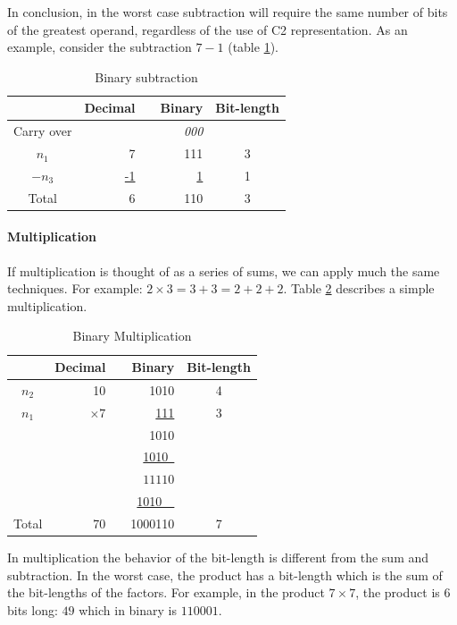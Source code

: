 \documentclass[10pt]{article}
\begin{document}
In conclusion, in the worst case subtraction will require the same number of
bits of the greatest operand, regardless of the use of C2 representation. As an
example, consider the subtraction $7-1$ (table \ref{tab:05}).

\begin{table}[ht]
  \centering
  \caption{Binary subtraction}
  \begin{tabular}{crrrc}
    \hline
	  & Decimal & & Binary & Bit-length \\
    \hline      
    Carry over & 	& & \textit{000} & \\
    $n_1$ & 7	& & 111 & 3 \\
    $-n_3$ & \underline{-1} & & \underline{1} & 1 \\
    Total & 6	& & 110 & 3\\
    \hline
  \end{tabular}
  \label{tab:05}
\end{table}

\paragraph{Multiplication}
If multiplication is thought of as a series of sums, we can apply much the same
techniques. For example: $2 \times 3 = 3 + 3 = 2 + 2 + 2$. Table \ref{tab:06}
describes a simple multiplication.

\begin{table}[ht]
  \centering
  \caption{Binary Multiplication}
  \begin{tabular}{crrrc}
  \hline
	& Decimal & & Binary & Bit-length \\
  \hline      
  $n_2$ & 10	& & 1010 & 4\\
  $n_1$ & \underline{$\times 7$} & & \underline{111} & 3 \\
  & & & 1010  & \\
  & & & \underline{1010\ } & \\
  & & & $11110$ & \\
  & & & \underline{1010\ \ } & \\
  Total& 70 & & 1000110 & 7\\
  \hline
      \end{tabular}
  \label{tab:06}
\end{table}

In multiplication the behavior of the bit-length is different from the sum and
subtraction. In the worst case, the product has a bit-length which is the sum of
the bit-lengths of the factors. For example, in the product $7\times7$, the
product is 6 bits long: $49$ which in binary is $110001$.
\end{document}
